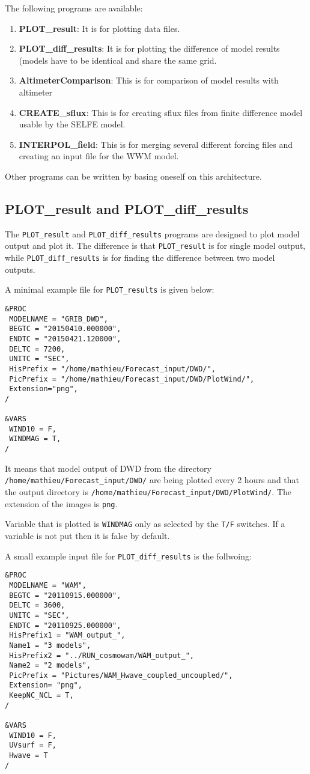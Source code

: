 \documentclass[12pt]{amsart}
\begin{document}
The following programs are available:
\begin{enumerate}
\item {\bf PLOT\_result}: It is for plotting data files.
\item {\bf PLOT\_diff\_results}: It is for plotting the difference of model results (models have to be identical and share the same grid.
\item {\bf AltimeterComparison}: This is for comparison of model results with altimeter
\item {\bf CREATE\_sflux}: This is for creating sflux files from finite difference model usable by the SELFE model.
\item {\bf INTERPOL\_field}: This is for merging several different forcing files and creating an input file for the WWM model.
\end{enumerate}
Other programs can be written by basing oneself on this architecture.



\subsection{PLOT\_result and PLOT\_diff\_results}

The {\tt PLOT\_result} and {\tt PLOT\_diff\_results} programs are designed to plot model output and plot it. The difference is that {\tt PLOT\_result} is for single model output, while {\tt PLOT\_diff\_results} is for finding the difference between two model outputs.

A minimal example file for {\tt PLOT\_results} is given below:
\begin{verbatim}
&PROC
 MODELNAME = "GRIB_DWD", 
 BEGTC = "20150410.000000",
 ENDTC = "20150421.120000",
 DELTC = 7200, 
 UNITC = "SEC", 
 HisPrefix = "/home/mathieu/Forecast_input/DWD/", 
 PicPrefix = "/home/mathieu/Forecast_input/DWD/PlotWind/", 
 Extension="png",
/

&VARS
 WIND10 = F, 
 WINDMAG = T, 
/
\end{verbatim}
It means that model output of DWD from the directory {\tt /home/mathieu/Forecast\_input/DWD/} are being plotted every 2 hours and that the output directory is {\tt /home/mathieu/Forecast\_input/DWD/PlotWind/}. The extension of the images is {\tt png}.

Variable that is plotted is {\tt WINDMAG} only as selected by the {\tt T/F} switches. If a variable is not put then it is false by default.

A small example input file for {\tt PLOT\_diff\_results} is the follwoing:
\begin{verbatim}
&PROC
 MODELNAME = "WAM", 
 BEGTC = "20110915.000000", 
 DELTC = 3600, 
 UNITC = "SEC", 
 ENDTC = "20110925.000000", 
 HisPrefix1 = "WAM_output_", 
 Name1 = "3 models",
 HisPrefix2 = "../RUN_cosmowam/WAM_output_", 
 Name2 = "2 models",
 PicPrefix = "Pictures/WAM_Hwave_coupled_uncoupled/",
 Extension= "png",
 KeepNC_NCL = T,
/

&VARS
 WIND10 = F, 
 UVsurf = F, 
 Hwave = T
/
\end{verbatim}
\end{document}
